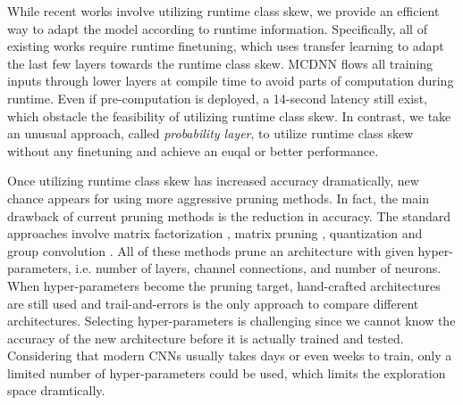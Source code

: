 \documentclass[pageno]{jpaper}
\begin{document}
While recent works involve utilizing runtime class skew, we provide an efficient way to adapt the model according to runtime information. Specifically, all of existing works \cite{han2016mcdnn, shen2016fast} require runtime finetuning, which uses transfer learning \cite{doersch2015unsupervised, noroozi2016unsupervised, oquab2014learning, yosinski2014transferable} to adapt the last few layers towards the runtime class skew. MCDNN \cite{han2016mcdnn} flows all training inputs through lower layers at compile time to avoid parts of computation during runtime. Even if pre-computation is deployed, a 14-second latency still exist, which obstacle the feasibility of utilizing runtime class skew. In contrast, we take an unusual approach, called \textit{probability layer}, to utilize runtime class skew without any finetuning and achieve an euqal or better performance.

Once utilizing runtime class skew has increased accuracy dramatically, new chance appears for using more aggressive pruning methods. In fact, the main drawback of current pruning methods is the reduction in accuracy. The standard approaches involve matrix factorization \cite{jaderberg2014speeding, kim2015compression, xue2014singular}, matrix pruning \cite{chen2015compressing, han2015learning}, quantization \cite{bagherinezhad2017lcnn, han2015deep} and group convolution \cite{howard2017mobilenets, ZhaZho17ShuffleNet}. All of these methods prune an architecture with given hyper-parameters, i.e. number of layers, channel connections, and number of neurons. When hyper-parameters become the pruning target, hand-crafted architectures are still used and trail-and-errors is the only approach to compare different architectures. Selecting hyper-parameters is challenging since we cannot know the accuracy of the new architecture before it is actually trained and tested. Considering that modern CNNs usually takes days or even weeks to train, only a limited number of hyper-parameters could be used, which limits the exploration space dramtically.
\end{document}
